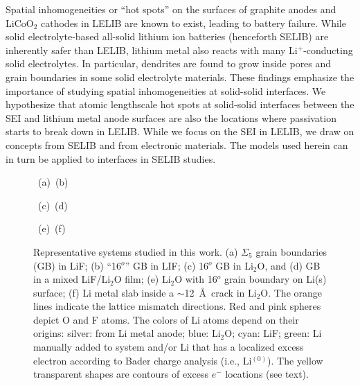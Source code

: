 \documentclass[prb,preprint,amsmath,amssymb]{revtex4}
\begin{document}
Spatial inhomogeneities or ``hot spots'' on the surfaces of graphite anodes
and LiCoO$_2$ cathodes in LELIB are known to exist, leading to battery
failure.\cite{harris}  While solid electrolyte-based all-solid lithium ion
batteries (henceforth SELIB) are inherently safer than LELIB, lithium metal
also reacts with many Li$^+$-conducting solid electrolytes.  In particular,
dendrites are found to grow inside pores and grain boundaries in some solid
electrolyte materials.\cite{pore,pore1} These findings emphasize the
importance of studying spatial inhomogeneities at solid-solid interfaces.  
We hypothesize that atomic lengthscale hot spots at solid-solid interfaces
between the SEI and lithium metal anode surfaces are also the locations where
passivation starts to break down in LELIB.\cite{jungjohann}    While we focus
on the SEI in LELIB, we draw on concepts from SELIB and from electronic
materials.\cite{shluger,liair,fisher,islam,twin}  The models used herein can in
turn be applied to interfaces in SELIB studies.

\begin{figure}
\centerline{\hbox{ (a) \epsfxsize=2.20in  
		   \epsfxsize=2.20in  (b)}}
\centerline{\hbox{ (c) \epsfxsize=2.20in  
		   \epsfxsize=2.20in  (d)}}
\centerline{\hbox{ (e) \epsfxsize=2.20in  
		   \epsfxsize=2.20in  (f)}}
\caption[]
{\label{fig1} \noindent
Representative systems studied in this work.  (a) $\Sigma_5$ grain boundaries
(GB) in LiF; (b) ``16$^o$'' GB in LIF; (c) 16$^o$ GB in Li$_2$O, and (d) GB in
a mixed LiF/Li$_2$O film; (e) Li$_2$O with 16$^o$ grain boundary on Li(s)
surface; (f) Li metal slab inside a $\sim$12~\AA\, crack in Li$_2$O.  
The orange lines indicate the lattice mismatch directions.
Red and pink spheres depict O and F atoms.  The colors of Li atoms depend on
their origins: silver: from Li metal anode; blue: Li$_2$O; cyan: LiF; green:
Li manually added to system and/or Li that has a localized excess electron
according to Bader charge analysis (i.e., Li$^{(0)}$).  The yellow transparent
shapes are contours of excess $e^-$ locations (see text).
}
\end{figure}
\end{document}
